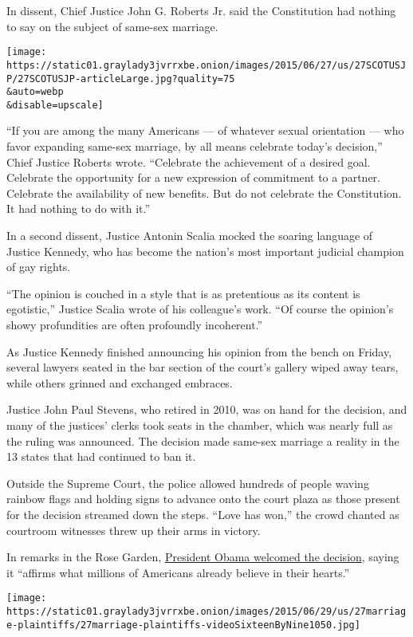 In dissent, Chief Justice John G. Roberts Jr. said the Constitution had
nothing to say on the subject of same-sex marriage.

\texttt{[image: https://static01.graylady3jvrrxbe.onion/images/2015/06/27/us/27SCOTUSJP/27SCOTUSJP-articleLarge.jpg?quality=75\\\&auto=webp\\\&disable=upscale]}

``If you are among the many Americans --- of whatever sexual orientation
--- who favor expanding same-sex marriage, by all means celebrate
today's decision,'' Chief Justice Roberts wrote. ``Celebrate the
achievement of a desired goal. Celebrate the opportunity for a new
expression of commitment to a partner. Celebrate the availability of new
benefits. But do not celebrate the Constitution. It had nothing to do
with it.''

In a second dissent, Justice Antonin Scalia mocked the soaring language
of Justice Kennedy, who has become the nation's most important judicial
champion of gay rights.

``The opinion is couched in a style that is as pretentious as its
content is egotistic,'' Justice Scalia wrote of his colleague's work.
``Of course the opinion's showy profundities are often profoundly
incoherent.''

As Justice Kennedy finished announcing his opinion from the bench on
Friday, several lawyers seated in the bar section of the court's gallery
wiped away tears, while others grinned and exchanged embraces.

Justice John Paul Stevens, who retired in 2010, was on hand for the
decision, and many of the justices' clerks took seats in the chamber,
which was nearly full as the ruling was announced. The decision made
same-sex marriage a reality in the 13 states that had continued to ban
it.

Outside the Supreme Court, the police allowed hundreds of people waving
rainbow flags and holding signs to advance onto the court plaza as those
present for the decision streamed down the steps. ``Love has won,'' the
crowd chanted as courtroom witnesses threw up their arms in victory.

In remarks in the Rose Garden,
\href{http://www.nytimes3xbfgragh.onion/video/us/politics/100000003766147/obama-on-same-sex-marriage-ruling.html?hp\&action=click\&pgtype=Homepage\&module=a-lede-package-region\&region=top-news\&WT.nav=top-news}{President
Obama welcomed the decision}, saying it ``affirms what millions of
Americans already believe in their hearts.''

\texttt{[image: https://static01.graylady3jvrrxbe.onion/images/2015/06/29/us/27marriage-plaintiffs/27marriage-plaintiffs-videoSixteenByNine1050.jpg]}

